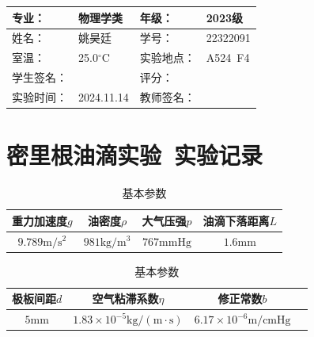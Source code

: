 \documentclass[dvipsnames, svgnames,a4paper,11pt]{article}
\begin{document}
\clearpage
{}
\begin{table}
	\renewcommand\arraystretch{1.7}
	\centering
	\begin{tabularx}{\textwidth}{|X|X|X|X|}
	\hline
	专业：& 物理学类 &年级：& 2023级 \\
	\hline
	姓名： &姚昊廷& 学号：&22322091  \\
	\hline
	室温：&25.0$^\circ$C&实验地点：&A524\ F4\\
	\hline
	学生签名：& & 评分： &\\
	\hline
	实验时间：& 2024.11.14& 教师签名：&\\
	\hline
	\end{tabularx}
\end{table}
\section{密里根油滴实验\ \textbf{实验记录}}
\begin{table}[H]
	\centering
	\begin{tabular}{cccc}
		\toprule
		重力加速度$g$& 油密度$\rho$ & 大气压强$p$ & 油滴下落距离$L$\\
		\midrule
		$9.789\text{m}/\text{s}^2$ & $981\text{kg}/\text{m}^3$ & $767\text{mmHg}$ & $1.6\text{mm}$ \\
		\bottomrule
	\end{tabular}
	\vspace{0.1cm}
	\begin{tabular}{cccc}
		\toprule
		极板间距$d$& 空气粘滞系数$\eta$ & 修正常数$b$ & \\
		\midrule
		$5\text{mm}$ & $1.83\times10^{-5}\text{kg}/(\text{m}\cdot\text{s})$ & $6.17\times10^{-6}\text{m}/\text{cmHg}$ &  \\
		\bottomrule
	 \end{tabular}
	 \caption{基本参数}
\end{table}
\end{document}
